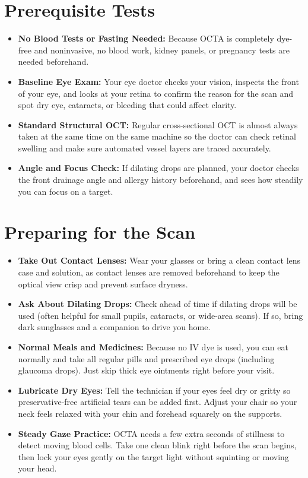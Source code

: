 \section{Prerequisite Tests}
\begin{itemize}
\item \textbf{No Blood Tests or Fasting Needed:} Because OCTA is completely dye-free and noninvasive, no blood work, kidney panels, or pregnancy tests are needed beforehand.
\item \textbf{Baseline Eye Exam:} Your eye doctor checks your vision, inspects the front of your eye, and looks at your retina to confirm the reason for the scan and spot dry eye, cataracts, or bleeding that could affect clarity.
\item \textbf{Standard Structural OCT:} Regular cross-sectional OCT is almost always taken at the same time on the same machine so the doctor can check retinal swelling and make sure automated vessel layers are traced accurately.
\item \textbf{Angle and Focus Check:} If dilating drops are planned, your doctor checks the front drainage angle and allergy history beforehand, and sees how steadily you can focus on a target.
\end{itemize}

\section{Preparing for the Scan}
\begin{itemize}
\item \textbf{Take Out Contact Lenses:} Wear your glasses or bring a clean contact lens case and solution, as contact lenses are removed beforehand to keep the optical view crisp and prevent surface dryness.
\item \textbf{Ask About Dilating Drops:} Check ahead of time if dilating drops will be used (often helpful for small pupils, cataracts, or wide-area scans). If so, bring dark sunglasses and a companion to drive you home.
\item \textbf{Normal Meals and Medicines:} Because no IV dye is used, you can eat normally and take all regular pills and prescribed eye drops (including glaucoma drops). Just skip thick eye ointments right before your visit.
\item \textbf{Lubricate Dry Eyes:} Tell the technician if your eyes feel dry or gritty so preservative-free artificial tears can be added first. Adjust your chair so your neck feels relaxed with your chin and forehead squarely on the supports.
\item \textbf{Steady Gaze Practice:} OCTA needs a few extra seconds of stillness to detect moving blood cells. Take one clean blink right before the scan begins, then lock your eyes gently on the target light without squinting or moving your head.
\end{itemize}

